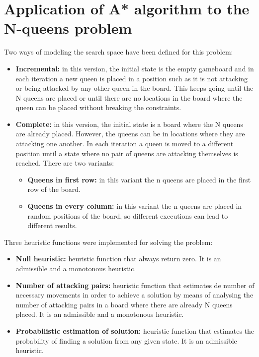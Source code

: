 \documentclass[]{llncs}
\begin{document}
\section{Application of A* algorithm to the N-queens problem}\label{astar_nqueens}
Two ways of modeling the search space have been defined for this problem:
\begin{itemize}
    \item \textbf{Incremental:} in this version, the initial state is the empty gameboard and in each iteration a new queen is placed in a position such as it is not attacking or being attacked by any other queen in the board. This keeps going until the N queens are placed or until there are no locations in the board where the queen can be placed without breaking the constraints.
    \item \textbf{Complete:} in this version, the initial state is a board where the N queens are already placed. However, the queens can be in locations where they are attacking one another. In each iteration a queen is moved to a different position until a state where no pair of queens are attacking themselves is reached. There are two variants:
    \begin{itemize}
        \item \textbf{Queens in first row:} in this variant the n queens are placed in the first row of the board.
        \item \textbf{Queens in every column:} in this variant the n queens are placed in random positions of the board, so different executions can lead to different results.
    \end{itemize}
\end{itemize}
Three heuristic functions were implemented for solving the problem:
\begin{itemize}
    \item \textbf{Null heuristic:} heuristic function that always return zero. It is an admissible and a monotonous heuristic.  
    \item \textbf{Number of attacking pairs:} heuristic function that estimates de number of necessary movements in order to achieve a solution by means of analysing the number of attacking pairs in a board where there are already N queens placed. It is an admissible and a monotonous heuristic.
    \item \textbf{Probabilistic estimation of solution:} heuristic function that estimates the probability of finding a solution from any given state. It is an admissible heuristic. 
\end{itemize}
\end{document}
